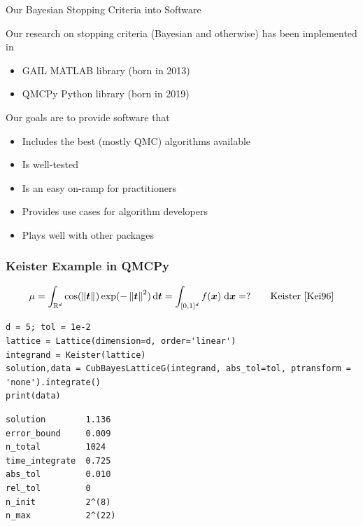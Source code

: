 \documentclass[11pt,compress,xcolor={usenames,dvipsnames},aspectratio=169]{beamer}
\begin{document}
\begin{frame}{Our Bayesian Stopping Criteria into Software}
	
	\vspace{-3ex}
	
	Our research on stopping criteria (Bayesian and otherwise) has been implemented in
	\begin{itemize}
		\item GAIL \cite{ChoEtal21a} MATLAB library (born in 2013)
		\item QMCPy \cite{QMCPy2020a} Python library (born in 2019)
	\end{itemize}
Our goals are to provide software that 
\begin{itemize}
	\item Includes the best (mostly QMC) algorithms available
	\item Is well-tested
	\item Is an easy on-ramp for practitioners
	\item Provides use cases for algorithm developers 
	\item Plays well with other packages
\end{itemize}
	
	
\end{frame}
	

\begin{frame}[fragile]\frametitle{Keister Example in QMCPy \href{https://colab.research.google.com/drive/1KrlrtLu7j8Ff7YsSJjPMiGUr-UKfqwxm?usp=sharing}{}}
	\vspace{-5ex}
	\[
	\mu = \int_{\mathbb{R}^d} \cos(\left \lVert \boldsymbol{t} \right \rVert_{{}}) \exp(-\left \lVert \boldsymbol{t} \right \rVert_{{}}^2) \, {\rm d} \boldsymbol{t} = \int_{[0,1]^d} f(\boldsymbol{x}) \; {\rm d} \boldsymbol{x} =  ? \qquad \text{Keister \cite{Kei96}}
	\]
\noindent\begin{minipage}{0.47\textwidth}
\begin{lstlisting}[style=Python]
d = 5; tol = 1e-2
lattice = Lattice(dimension=d, order='linear')
integrand = Keister(lattice)
solution,data = CubBayesLatticeG(integrand, abs_tol=tol, ptransform = 'none').integrate()
print(data)
\end{lstlisting}
\end{minipage} 
\qquad
\begin{minipage}{0.47\textwidth}
\begin{lstlisting}[style=Python]
solution        1.136
error_bound     0.009
n_total         1024
time_integrate  0.725
abs_tol         0.010
rel_tol         0
n_init          2^(8)
n_max           2^(22)
\end{lstlisting}
\end{minipage} 

\end{frame}
\end{document}
